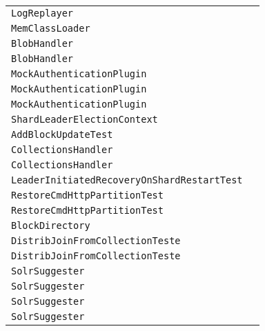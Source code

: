 \begin{center}
\begin{tabular}{ll}
\lstinline/LogReplayer/&\raisebox{0pt}{\lstinline/run()/}\\
\lstinline/MemClassLoader/&\raisebox{0pt}{\lstinline/loadFromRuntimeLibs(String)/}\\
\lstinline/BlobHandler/&\raisebox{0pt}{\lstinline/indexMap()/}\\
\lstinline/BlobHandler/&\raisebox{0pt}{\lstinline/indexMap()/}\\
\lstinline/MockAuthenticationPlugin/&\raisebox{0pt}{\lstinline/doAuthenticate(ServletRequest)/}\\
\lstinline/MockAuthenticationPlugin/&\raisebox{0pt}{\lstinline/doAuthenticate(ServletRequest)/}\\
\lstinline/MockAuthenticationPlugin/&\raisebox{0pt}{\lstinline/doAuthenticate(ServletRequest)/}\\
\lstinline/ShardLeaderElectionContext/&\raisebox{0pt}{\lstinline/rejoinLeaderElection(SolrCorecore)/}\\
\lstinline/AddBlockUpdateTest/&\raisebox{0pt}{\lstinline/ExceptionThrown()/}\\
\lstinline/CollectionsHandler/&\raisebox{0pt}{\lstinline/waitForActiveCollection(String)/}\\
\lstinline/CollectionsHandler/&\raisebox{0pt}{\lstinline/waitForActiveCollection(String)/}\\
\lstinline/LeaderInitiatedRecoveryOnShardRestartTest/&\raisebox{0pt}{\lstinline/RestartWithAllInLIR()/}\\
\lstinline/RestoreCmdHttpPartitionTest/&\raisebox{0pt}{\lstinline/call(ClusterState)/}\\
\lstinline/RestoreCmdHttpPartitionTest/&\raisebox{0pt}{\lstinline/call(ClusterState)/}\\
\lstinline/BlockDirectory/&\raisebox{0pt}{\lstinline/closeOnShutdown()/}\\
\lstinline/DistribJoinFromCollectionTeste/&\raisebox{0pt}{\lstinline/Classshutdown()/}\\
\lstinline/DistribJoinFromCollectionTeste/&\raisebox{0pt}{\lstinline/Classshutdown()/}\\
\lstinline/SolrSuggester/&\raisebox{0pt}{\lstinline/SuggesterResultgetSuggestions(SuggesterOptions)/}\\
\lstinline/SolrSuggester/&\raisebox{0pt}{\lstinline/SuggesterResultgetSuggestions(SuggesterOptions)/}\\
\lstinline/SolrSuggester/&\raisebox{0pt}{\lstinline/SuggesterResultgetSuggestions(SuggesterOptions)/}\\
\lstinline/SolrSuggester/&\raisebox{0pt}{\lstinline/SuggesterResultgetSuggestions(SuggesterOptions)/}\\

\end{tabular}
\end{center}
